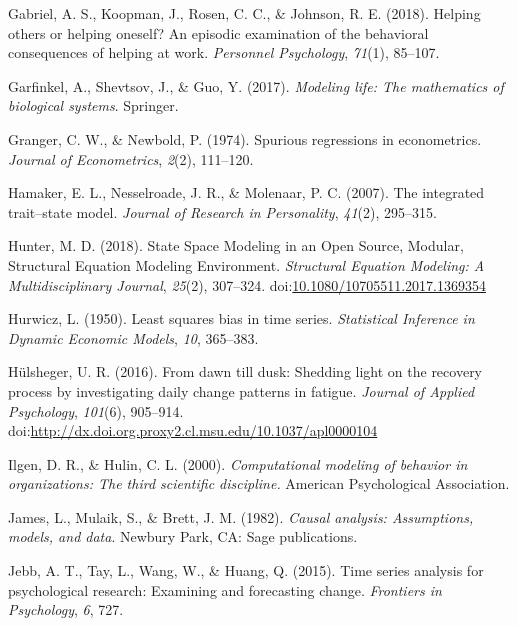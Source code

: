 \documentclass[english,,man]{apa6}
\theoremstyle{definition}
\theoremstyle{definition}
\theoremstyle{definition}
\theoremstyle{remark}
\begin{document}
\leavevmode\hypertarget{ref-gabriel_helping_2018}{}%
Gabriel, A. S., Koopman, J., Rosen, C. C., \& Johnson, R. E. (2018).
Helping others or helping oneself? An episodic examination of the
behavioral consequences of helping at work. \emph{Personnel Psychology},
\emph{71}(1), 85--107.

\leavevmode\hypertarget{ref-garfinkel2017modeling}{}%
Garfinkel, A., Shevtsov, J., \& Guo, Y. (2017). \emph{Modeling life: The
mathematics of biological systems}. Springer.

\leavevmode\hypertarget{ref-granger_spurious_1974}{}%
Granger, C. W., \& Newbold, P. (1974). Spurious regressions in
econometrics. \emph{Journal of Econometrics}, \emph{2}(2), 111--120.

\leavevmode\hypertarget{ref-hamaker2007integrated}{}%
Hamaker, E. L., Nesselroade, J. R., \& Molenaar, P. C. (2007). The
integrated trait--state model. \emph{Journal of Research in
Personality}, \emph{41}(2), 295--315.

\leavevmode\hypertarget{ref-hunter_state_2018}{}%
Hunter, M. D. (2018). State Space Modeling in an Open Source, Modular,
Structural Equation Modeling Environment. \emph{Structural Equation
Modeling: A Multidisciplinary Journal}, \emph{25}(2), 307--324.
doi:\href{https://doi.org/10.1080/10705511.2017.1369354}{10.1080/10705511.2017.1369354}

\leavevmode\hypertarget{ref-hurwicz1950least}{}%
Hurwicz, L. (1950). Least squares bias in time series. \emph{Statistical
Inference in Dynamic Economic Models}, \emph{10}, 365--383.

\leavevmode\hypertarget{ref-hulsheger_dawn_2016}{}%
Hülsheger, U. R. (2016). From dawn till dusk: Shedding light on the
recovery process by investigating daily change patterns in fatigue.
\emph{Journal of Applied Psychology}, \emph{101}(6), 905--914.
doi:\href{https://doi.org/http://dx.doi.org.proxy2.cl.msu.edu/10.1037/apl0000104}{http://dx.doi.org.proxy2.cl.msu.edu/10.1037/apl0000104}

\leavevmode\hypertarget{ref-ilgen_computational_2000}{}%
Ilgen, D. R., \& Hulin, C. L. (2000). \emph{Computational modeling of
behavior in organizations: The third scientific discipline.} American
Psychological Association.

\leavevmode\hypertarget{ref-james1982causal}{}%
James, L., Mulaik, S., \& Brett, J. M. (1982). \emph{Causal analysis:
Assumptions, models, and data}. Newbury Park, CA: Sage publications.

\leavevmode\hypertarget{ref-jebb_time_2015}{}%
Jebb, A. T., Tay, L., Wang, W., \& Huang, Q. (2015). Time series
analysis for psychological research: Examining and forecasting change.
\emph{Frontiers in Psychology}, \emph{6}, 727.
\end{document}
